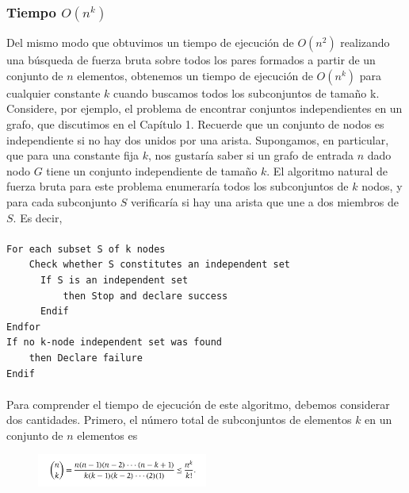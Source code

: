 \documentclass[a4paper, 12pt]{book}
\begin{document}
\subsubsection*{Tiempo $O(n^k)$} 

Del mismo modo que obtuvimos un tiempo de ejecución de $O(n^2)$ realizando una búsqueda de fuerza bruta sobre todos los pares formados a partir de un conjunto de $n$ elementos, obtenemos un tiempo de ejecución de $O(n^k)$ para cualquier constante $k$ cuando buscamos todos los subconjuntos de tamaño k.\\

Considere, por ejemplo, el problema de encontrar conjuntos independientes en un grafo, que discutimos en el Capítulo 1. Recuerde que un conjunto de nodos es independiente si no hay dos unidos por una arista. Supongamos, en particular, que para una constante fija $k$, nos gustaría saber si un grafo de entrada $n$ dado nodo $G$ tiene un conjunto independiente de tamaño $k$. El algoritmo natural de fuerza bruta para este problema enumeraría todos los subconjuntos de $k$ nodos, y para cada subconjunto $S$ verificaría si hay una arista que une a dos miembros de $S$. Es decir, \\
\paragraph{}
\begin{lstlisting}
For each subset S of k nodes
	Check whether S constitutes an independent set
      If S is an independent set 
          then Stop and declare success
      Endif
Endfor
If no k-node independent set was found 
	then Declare failure
Endif
\end{lstlisting}
\paragraph{}

Para comprender el tiempo de ejecución de este algoritmo, debemos considerar dos cantidades. Primero, el número total de subconjuntos de elementos $k$ en un conjunto de $n$ elementos es\\



\begin{figure}[h] 
  \centering
    \includegraphics[width=0.5\textwidth]{Imagenes-Seccion2/form_2_3.PNG}
\end{figure}
\end{document}
